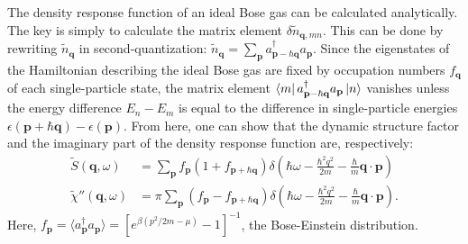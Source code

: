 \documentclass[reprint,
nofootinbib,
amsmath,amssymb,
aps]{revtex4-1}
\newcommand{\be}{\beta}
\newcommand{\f}[2]{\frac{#1}{#2}}
\newcommand{\lp}{\left(}
\newcommand{\rp}{\right)}
\begin{document}
The density response function of an ideal Bose gas can be calculated analytically. The key is simply to calculate the matrix element $\delta \widetilde{n}_{\mathbf{q},mn}$. This can be done by rewriting $\widetilde{n}_\mathbf{q}$ in second-quantization: $\widetilde{n}_\mathbf{q} = \sum_\mathbf{p} a^\dagger_{\mathbf{p} - \hbar \mathbf{q}} a_\mathbf{p} $. Since the eigenstates of the Hamiltonian describing the ideal Bose gas are fixed by occupation numbers $f_\mathbf{q}$ of each single-particle state, the matrix element $\bra{m} a^\dagger_{\mathbf{p} - \hbar \mathbf{q}} a_\mathbf{p} \ket{n}$ vanishes unless the energy difference $E_n - E_m$ is equal to the difference in single-particle energies $\epsilon(\mathbf{p} + \hbar \mathbf{q}) - \epsilon(\mathbf{p})$. From here, one can show that the dynamic structure factor and the imaginary part of the density response function are, respectively:
\begin{align*}
\widetilde{S}(\mathbf{q},\omega) &= \sum_\mathbf{p} f_\mathbf{p}(1 + f_{\mathbf{p} + \hbar \mathbf{q}}) \delta 
\lp
\hbar \omega - \f{\hbar^2 q^2}{ 2m} - \f{\hbar }{m} \mathbf{q}\cdot \mathbf{p}
\rp \\
\widetilde{\chi}''(\mathbf{q},\omega) 
&= 
\pi \sum_\mathbf{p} (f_\mathbf{p} - f_{\mathbf{p} + \hbar \mathbf{q}}) \delta 
\lp  
\hbar \omega - \f{\hbar^2 q^2}{ 2m} - \f{\hbar }{m} \mathbf{q}\cdot \mathbf{p}
\rp.
\end{align*}
Here, $f_\mathbf{p} = \langle a^\dagger_\mathbf{p} a_\mathbf{p}\rangle = [e^{\be(p^2/2m - \mu)} - 1]^{-1}$, the Bose-Einstein distribution. 
\end{document}
